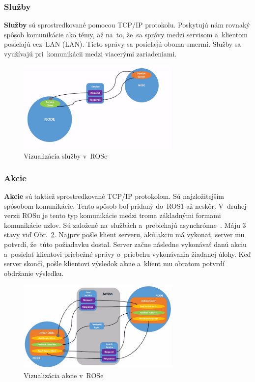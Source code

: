 \newpage
\subsubsection{Služby}
\label{sec:services}

	\textbf {Služby} sú sprostredkované pomocou TCP/IP protokolu. Poskytujú nám rovnaký spôsob komunikácie ako témy, až na~to, že~sa správy
	medzi servisom a~klientom posielajú cez~LAN (\acrlong{LAN}). Tieto správy sa posielajú oboma smermi. Služby sa využívajú pri~komunikácii
	medzi viacerými zariadeniami.

	\begin{figure}[h]
		\centering
		\includegraphics[width=8cm]{img/serviceExplanation.png}
		\caption{Vizualizácia služby v~ROSe~\cite{RosDoc}}
		\label{fig:service}
	\end{figure}

\subsubsection{Akcie}
\label{sec:actions}
	\label{s_action}
	\textbf {Akcie} sú taktiež sprostredkované TCP/IP protokolom. Sú najzložitejším spôsobom komunikácie. Tento spôsob bol pridaný do~ROS1
	až neskôr. V~druhej verzii ROSu je tento typ komunikácie medzi troma základnými formami komunikácie uzlov. Sú založené na~službách
	a~prebiehajú asynchrónne~\cite{ROS2book}. Máju 3 stavy viď Obr.~\ref{fig:action}. Najprv pošle klient serveru, akú akciu má vykonať,
	server mu potvrdí, že~túto požiadavku dostal. Server začne následne vykonávať danú akciu a~posielať klientovi priebežné správy o~priebehu
	vykonávania žiadanej úlohy. Keď server skončí, pošle klientovi výsledok akcie a~klient mu obratom potvrdí obdržanie výsledku.

	\begin{figure}[h]
		\centering
		\includegraphics[width=8cm]{img/actionExplanation.png}
		\caption{Vizualizácia akcie v~ROSe~\cite{RosDoc}}
		\label{fig:action}
	\end{figure}

